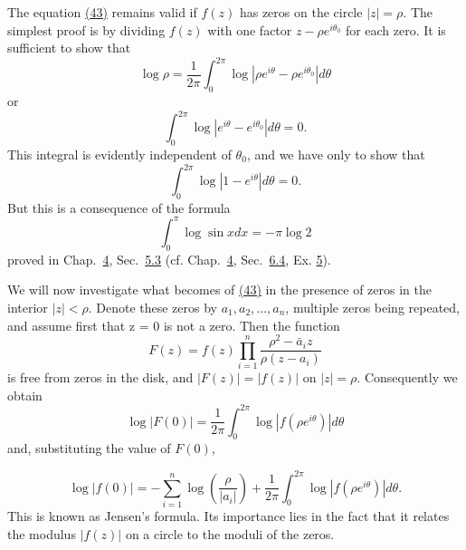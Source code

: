 The equation \hyperref[eq:5.43]{(43)} remains valid if $f(z)$ has zeros on the circle $|z| = \rho$. The simplest proof is by dividing $f(z)$ with one factor $z - \rho e^{i\theta_{0}}$ for each zero. It is sufficient to show that
\begin{equation*}
\log \rho = \frac {1}{2 \pi} \int_ {0} ^ {2 \pi} \log | \rho e ^ {i \theta} - \rho e ^ {i \theta_ {0}} | d \theta
\end{equation*}
or
\begin{equation*}
\int_ {0} ^ {2 \pi} \log | e ^ {i \theta} - e ^ {i \theta_ {0}} | d \theta = 0.
\end{equation*}
This integral is evidently independent of $\theta_{0}$, and we have only to show that
\begin{equation*}
\int_ {0} ^ {2 \pi} \log | 1 - e ^ {i \theta} | d \theta = 0.
\end{equation*}
But this is a consequence of the formula
\begin{equation*}
\int_ {0} ^ {\pi} \log \sin x d x = - \pi \log 2
\end{equation*}
proved in Chap.~\hyperref[chap:4]{4}, Sec.~\hyperref[sec:4.5.3]{5.3} (cf. Chap.~\hyperref[chap:4]{4}, Sec.~\hyperref[sec:4.6.4]{6.4}, Ex. \hyperref[exercise:4.6.4.12.5]{5}).

We will now investigate what becomes of \hyperref[eq:5.43]{(43)} in the presence of zeros in the interior $|z| < \rho$. Denote these zeros by $a_{1}, a_{2}, \ldots, a_{n}$, multiple zeros being repeated, and assume first that z = 0 is not a zero. Then the function
\begin{equation*}
F (z) = f (z) \prod_ {i = 1} ^ {n} \frac {\rho^ {2} - \bar {a} _ {i} z}{\rho (z - a _ {i})}
\end{equation*}
is free from zeros in the disk, and $|F(z)| = |f(z)|$ on $|z| = \rho$. Consequently we obtain
\begin{equation*}
\log | F (0) | = \frac {1}{2 \pi} \int_ {0} ^ {2 \pi} \log | f (\rho e ^ {i \theta}) | d \theta
\end{equation*}
and, substituting the value of $F(0)$,


\begin{equation*}
\log | f (0) | = - \sum_ {i = 1} ^ {n} \log \left(\frac {\rho}{| a _ {i} |}\right) + \frac {1}{2 \pi} \int_ {0} ^ {2 \pi} \log | f (\rho e ^ {i \theta}) | d \theta .\tag{44}\label{eq:5.44}
\end{equation*}
This is known as Jensen's formula. Its importance lies in the fact that it relates the modulus $|f(z)|$ on a circle to the moduli of the zeros.

